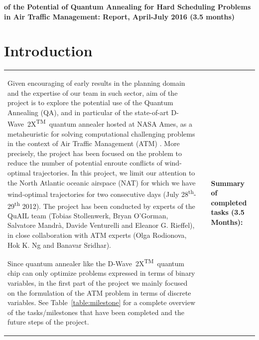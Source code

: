 \documentclass[9pt]{extarticle}
\renewcommand{\tablename}{Table}
\newcommand{\note}[1][]{\added[remark={#1}]}
\newcommand{\DW}{\mbox{D-Wave 2X\textsuperscript{TM}}~}
\begin{document}
\begin{center}\Large
\textbf{\note[Feel free to shuffle the order of the authors]{Exploration} of the Potential of Quantum Annealing for Hard Scheduling
Problems in Air Traffic Management: Report, April-July 2016 (3.5 months)}
\end{center}

\def\changemargin#1#2{\list{}{\rightmargin#2\leftmargin#1}\item[]}
\let\endchangemargin=\endlist 

\section*{Introduction}\label{sec:intro}

\hspace{-0.23cm}\begin{tabular}{p{9cm}p{0.1cm}p{8cm}}
\vspace{-5.3cm}
Given encouraging of early results in the planning domain \cite{rieffel:15,venturelli:15}
and the expertise of our team in such sector, 
aim of the project is to explore the potential use of the Quantum Annealing (QA), and in particular of the state-of-art \DW quantum annealer hosted at NASA Ames, 
as a metaheuristic for solving computational challenging problems in the context of
Air Traffic Management (ATM) \cite{rodionova:16, rodionova:thesis15}. More precisely, the project has been focused on the problem to reduce the number
of potential enroute conflicts of wind-optimal trajectories. 
In this project, we limit our attention to the North Atlantic oceanic airspace (NAT) for which we have wind-optimal trajectories
for two consecutive days (July 28\textsuperscript{th}-29\textsuperscript{th} 2012). The project has been conducted by experts of the QuAIL team
(Tobias Stollenwerk, Bryan O'Gorman, Salvatore Mandr\`a, Davide Venturelli and Eleanor G. Rieffel), in close collaboration with
ATM experts (Olga Rodionova, Hok K. Ng and Banavar Sridhar).

\vspace{0.1cm}\hspace{0.4cm} Since quantum annealer like the \DW quantum chip can only optimize problems expressed in terms of binary variables,
in the first part of the project we mainly focused on the formulation of the ATM problem in terms of discrete variables.
See \tablename~\ref{table:milestone} for a complete overview of the tasks/milestones that have been completed and the future steps
of the project.
&
&
\multicolumn{1}{p{8cm}}{
\cellcolor{gray!20}
\begin{minipage}{8cm}
\vspace{0.4cm}
\textbf{Summary of completed tasks (3.5 Months):}


\end{minipage}}
\end{tabular}
\end{document}
